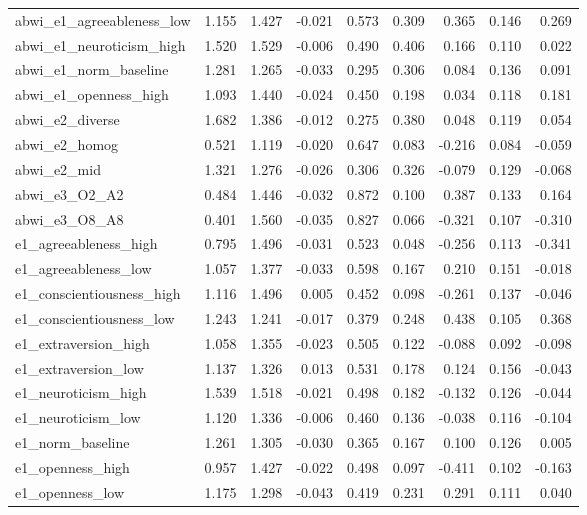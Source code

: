 \documentclass[11pt]{article}
\begin{document}
\begin{landscape}
\begin{longtable}{@{}lrrrrrrrr@{}}
abwi\_e1\_agreeableness\_low & 1.155 & 1.427 & -0.021 & 0.573 & 0.309 & 0.365 & 0.146 & 0.269 \\
abwi\_e1\_neuroticism\_high & 1.520 & 1.529 & -0.006 & 0.490 & 0.406 & 0.166 & 0.110 & 0.022 \\
abwi\_e1\_norm\_baseline & 1.281 & 1.265 & -0.033 & 0.295 & 0.306 & 0.084 & 0.136 & 0.091 \\
abwi\_e1\_openness\_high & 1.093 & 1.440 & -0.024 & 0.450 & 0.198 & 0.034 & 0.118 & 0.181 \\
abwi\_e2\_diverse & 1.682 & 1.386 & -0.012 & 0.275 & 0.380 & 0.048 & 0.119 & 0.054 \\
abwi\_e2\_homog & 0.521 & 1.119 & -0.020 & 0.647 & 0.083 & -0.216 & 0.084 & -0.059 \\
abwi\_e2\_mid & 1.321 & 1.276 & -0.026 & 0.306 & 0.326 & -0.079 & 0.129 & -0.068 \\
abwi\_e3\_O2\_A2 & 0.484 & 1.446 & -0.032 & 0.872 & 0.100 & 0.387 & 0.133 & 0.164 \\
abwi\_e3\_O8\_A8 & 0.401 & 1.560 & -0.035 & 0.827 & 0.066 & -0.321 & 0.107 & -0.310 \\
e1\_agreeableness\_high & 0.795 & 1.496 & -0.031 & 0.523 & 0.048 & -0.256 & 0.113 & -0.341 \\
e1\_agreeableness\_low & 1.057 & 1.377 & -0.033 & 0.598 & 0.167 & 0.210 & 0.151 & -0.018 \\
e1\_conscientiousness\_high & 1.116 & 1.496 & 0.005 & 0.452 & 0.098 & -0.261 & 0.137 & -0.046 \\
e1\_conscientiousness\_low & 1.243 & 1.241 & -0.017 & 0.379 & 0.248 & 0.438 & 0.105 & 0.368 \\
e1\_extraversion\_high & 1.058 & 1.355 & -0.023 & 0.505 & 0.122 & -0.088 & 0.092 & -0.098 \\
e1\_extraversion\_low & 1.137 & 1.326 & 0.013 & 0.531 & 0.178 & 0.124 & 0.156 & -0.043 \\
e1\_neuroticism\_high & 1.539 & 1.518 & -0.021 & 0.498 & 0.182 & -0.132 & 0.126 & -0.044 \\
e1\_neuroticism\_low & 1.120 & 1.336 & -0.006 & 0.460 & 0.136 & -0.038 & 0.116 & -0.104 \\
e1\_norm\_baseline & 1.261 & 1.305 & -0.030 & 0.365 & 0.167 & 0.100 & 0.126 & 0.005 \\
e1\_openness\_high & 0.957 & 1.427 & -0.022 & 0.498 & 0.097 & -0.411 & 0.102 & -0.163 \\
e1\_openness\_low & 1.175 & 1.298 & -0.043 & 0.419 & 0.231 & 0.291 & 0.111 & 0.040 \\

\end{longtable}
\end{landscape}
\end{document}
